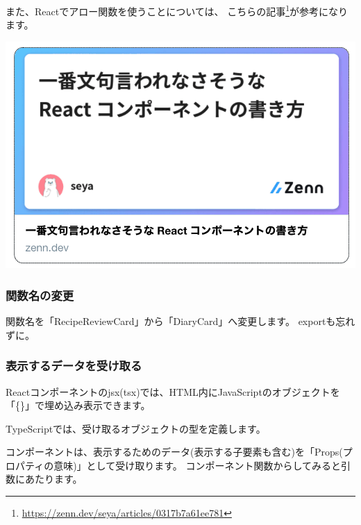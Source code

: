\clearpage


また、Reactでアロー関数を使うことについては、
こちらの記事\footnote{\url{https://zenn.dev/seya/articles/0317b7a61ee781}}が参考になります。

\begin{reviewimage}%
\includegraphics[width=0.5\maxwidth]{./images/03-todo-with-react/sec00332-1-02.png}%
\label{image:03-todo-with-react:sec00332-1-02}
\end{reviewimage}

\subsubsection*{関数名の変更}
\keeplastskip{
  \label{sec:3-3-4-2}
  \label{sec-00332-3}
  \par\nobreak
}

関数名を「RecipeReviewCard」から「DiaryCard」へ変更します。
exportも忘れずに。

\subsubsection*{表示するデータを受け取る}
\keeplastskip{
  \label{sec:3-3-4-3}
  \label{sec-00332-4}
  \par\nobreak
}

Reactコンポーネントのjsx(tsx)では、HTML内にJavaScriptのオブジェクトを「\{\}」で埋め込み表示できます。

TypeScriptでは、受け取るオブジェクトの型を定義します。

\vspace*{\baselineskip}

コンポーネントは、表示するためのデータ(表示する子要素も含む)を「Props(プロパティの意味)」として受け取ります。
コンポーネント関数からしてみると引数にあたります。

